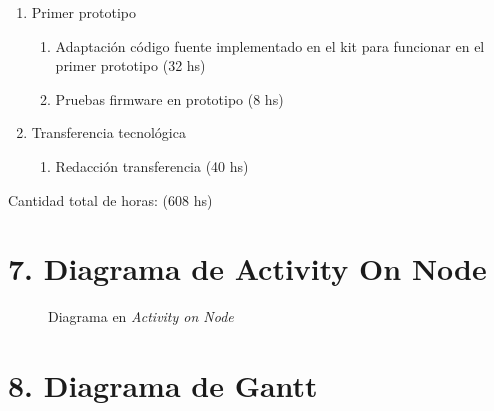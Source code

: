 \documentclass[11pt]{charter}
\begin{document}
\begin{enumerate}
\item Primer prototipo
	\begin{enumerate}
	\item Adaptación código fuente implementado en el kit para funcionar en el primer prototipo (32 hs)
	\item Pruebas firmware en prototipo (8 hs)
	\end{enumerate}	
\item Transferencia tecnológica
	\begin{enumerate}
	\item Redacción transferencia (40 hs)
	\end{enumerate}					
\end{enumerate}

Cantidad total de horas: (608 hs)




\section{7. Diagrama de Activity On Node}
\label{sec:AoN}


\begin{figure}[htpb]
\centering 
{}
\caption{Diagrama en \textit{Activity on Node}}
\label{fig:AoN}
\end{figure}


\newpage
\section{8. Diagrama de Gantt}
\label{sec:gantt}
\end{document}
